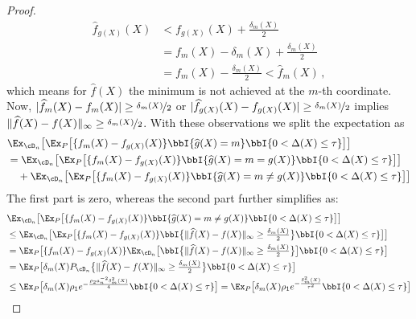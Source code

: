 \begin{proof}
    \[
    \begin{aligned}
        \textstyle \widehat f_{g(X)} (X) & <\textstyle  f_{g(X)}(X) + \frac{\delta_m(X)}{2} \\
        & \textstyle = f_m(X) - \delta_m(X) + \frac{\delta_m(X)}{2}\\
        & = \textstyle f_m(X) - \frac{\delta_m(X)}{2} < \widehat f_m(X)\,, 
    \end{aligned}
    \] which means for $\widehat f(X)$ the minimum is not achieved at the $m$-th coordinate. Now, $|\widehat f_m(X) - f_m(X)| \ge \nicefrac{\delta_m(X)}{2}$ or $|\widehat f_{g(X)}(X) - f_{g(X)}(X)| \ge \nicefrac{\delta_m(X)}{2}$ implies $\|\widehat f(X) - f(X) \|_\infty \ge \nicefrac{\delta_m(X)}{2}$. With these observations we split the expectation as
    \[
    \begin{aligned}
        & \textstyle  \Ex_{\cD_n}\big [ \Ex_P\big [ \{f_{m}(X) - f_{g(X)}(X)\} \bbI \{ \widehat g(X) = m\} \bbI \{ 0 < \Delta(X) \le \tau\}   \big]\big ]\\
        & \textstyle = \Ex_{\cD_n}\big [ \Ex_P\big [ \{f_{m}(X) - f_{g(X)}(X)\} \bbI \{ \widehat g(X) = m = g(X)\} \bbI \{ 0 < \Delta(X) \le \tau\}   \big]\big ] \\
        & \textstyle \quad + \Ex_{\cD_n}\big [ \Ex_P\big [ \{f_{m}(X) - f_{g(X)}(X)\} \bbI \{ \widehat g(X) = m \neq  g(X)\} \bbI \{ 0 < \Delta(X) \le \tau\}   \big]\big ] 
    \end{aligned}
    \] The first part is zero, whereas the second part further simplifies as: 
    \[
    \begin{aligned}
        & \textstyle  \Ex_{\cD_n}\big [ \Ex_P\big [ \{f_{m}(X) - f_{g(X)}(X)\} \bbI \{ \widehat g(X) = m \neq  g(X)\} \bbI \{ 0 < \Delta(X) \le \tau\}   \big]\big ] \\
        & \le  \textstyle \Ex_{\cD_n}\big [ \Ex_P\big [ \{f_{m}(X) - f_{g(X)}(X)\} \bbI \big \{\|\widehat f(X) - f(X) \|_\infty \ge \frac{\delta_m(X)}{2} \big \} \bbI \{ 0 < \Delta(X) \le \tau\}   \big]\big ] \\
        & = \textstyle \Ex_P\big [ \{f_{m}(X) - f_{g(X)}(X)\} \Ex_{\cD_n}\big [ \bbI \big \{\|\widehat f(X) - f(X) \|_\infty \ge \frac{\delta_m(X)}{2} \big \}\big] \bbI \{ 0 < \Delta(X) \le \tau\}   \big ] \\
        & = \textstyle \Ex_P\big [ \delta_m(X) P_{\cD_n} \big \{\|\widehat f(X) - f(X) \|_\infty \ge \frac{\delta_m(X)}{2} \big \} \bbI \{ 0 < \Delta(X) \le \tau\}   \big ] \\
        & \le  \textstyle \Ex_P\big [ \delta_m(X) \rho_1 e^{- \frac{\rho_2 a_n^{-2}\delta_m^2(X)}4 } \bbI \{ 0 < \Delta(X) \le \tau\}   \big ] = \textstyle \Ex_P\big [ \delta_m(X) \rho_1 e^{- \frac{\delta_m^2(X)}{\tau^2} } \bbI \{ 0 < \Delta(X) \le \tau\}   \big ]

\end{aligned}\]
\end{proof}
